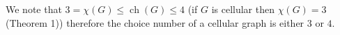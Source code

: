 \documentclass[letterpaper, 10 pt, conference]{ieeeconf}  %
\DeclareMathOperator*{\ch}{ch}
\begin{document}
We note that $3=\chi(G) \leqslant \ch(G) \leqslant 4$ (if $G$ is cellular then $\chi(G) = 3$ \cite{662943} (Theorem 1)) therefore the choice number of a cellular graph is either $3$ or $4$.
\addtolength{\textheight}{-12cm}   %

\end{document}
